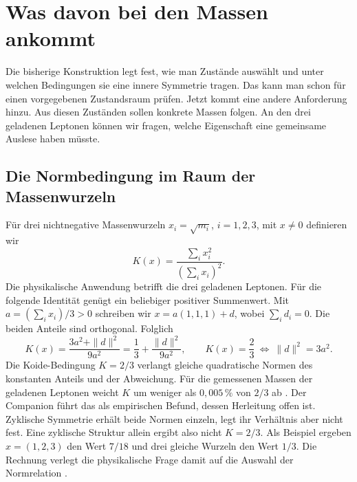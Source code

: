 \section{Was davon bei den Massen ankommt}
\label{sec:mass}

Die bisherige Konstruktion legt fest, wie man Zustände auswählt und unter welchen Bedingungen sie eine innere Symmetrie tragen. Das kann man schon für einen vorgegebenen Zustandsraum prüfen. Jetzt kommt eine andere Anforderung hinzu. Aus diesen Zuständen sollen konkrete Massen folgen. An den drei geladenen Leptonen können wir fragen, welche Eigenschaft eine gemeinsame Auslese haben müsste.

\subsection{Die Normbedingung im Raum der Massenwurzeln}

Für drei nichtnegative Massenwurzeln \(x_i=\sqrt{m_i}\), \(i=1,2,3\), mit \(x\ne0\) definieren wir
\begin{equation}
 K(x)=\frac{\sum_i x_i^2}{(\sum_i x_i)^2}.
 \label{eq:koide}
\end{equation}
Die physikalische Anwendung betrifft die drei geladenen Leptonen. Für die folgende Identität genügt ein beliebiger positiver Summenwert. Mit \(a=(\sum_i x_i)/3>0\) schreiben wir \(x=a(1,1,1)+d\), wobei \(\sum_i d_i=0\). Die beiden Anteile sind orthogonal. Folglich
\begin{equation}
 K(x)=\frac{3a^2+\|d\|^2}{9a^2}
      =\frac13+\frac{\|d\|^2}{9a^2},
 \qquad
 K(x)=\frac23\ \Longleftrightarrow\ \|d\|^2=3a^2 .
 \label{eq:equal-norm}
\end{equation}
Die Koide-Bedingung \(K=2/3\) \cite{koide} verlangt gleiche quadratische Normen des konstanten Anteils und der Abweichung. Für die gemessenen Massen der geladenen Leptonen weicht \(K\) um weniger als \(0{,}005\,\%\) von \(2/3\) ab \cite{pdg}. Der Companion führt das als empirischen Befund, dessen Herleitung offen ist. Zyklische Symmetrie erhält beide Normen einzeln, legt ihr Verhältnis aber nicht fest. Eine zyklische Struktur allein ergibt also nicht \(K=2/3\). Als Beispiel ergeben \(x=(1,2,3)\) den Wert \(7/18\) und drei gleiche Wurzeln den Wert \(1/3\). Die Rechnung verlegt die physikalische Frage damit auf die Auswahl der Normrelation \cite{physics}.

